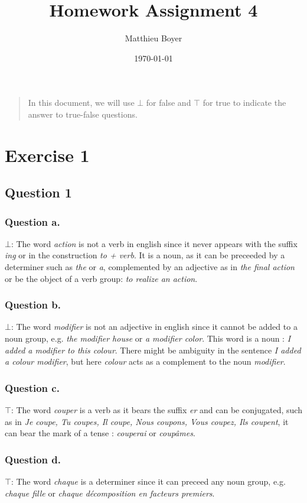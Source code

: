 \documentclass{cours}
\date{\today}
\title{Homework Assignment 4}
\author{Matthieu Boyer}
\begin{document}
\begin{quote}
    In this document, we will use $\bot$ for \textmd{false} and $\top$ for \textmd{true} to indicate the answer to true-false questions.
\end{quote}

\section{Exercise 1}
\subsection{Question 1}
\tocless\subsubsection{Question a.}
$\bot$: The word \textsl{action} is not a verb in english since it never appears with the suffix \textsl{ing} or in the construction \textsl{to + verb}. It is a noun, as it can be preceeded by a determiner such as \textsl{the} or \textsl{a}, complemented by an adjective as in \textsl{the final action} or be the object of a verb group: \textsl{to realize an action}.

\tocless\subsubsection{Question b.}
$\bot$: The word \textsl{modifier} is not an adjective in english since it cannot be added to a noun group, e.g. \textsl{the modifier house} or \textsl{a modifier color}. This word is a noun : \textsl{I added a modifier to this colour}. There might be ambiguity in the sentence \textsl{I added a colour modifier}, but here \textsl{colour} acts as a complement to the noun \textsl{modifier}.

\tocless\subsubsection{Question c.}
$\top$: The word \textsl{couper} is a verb as it bears the suffix \textsl{er} and can be conjugated, such as in \textsl{Je coupe, Tu coupes, Il coupe, Nous coupons, Vous coupez, Ils coupent}, it can bear the mark of a tense : \textsl{couperai} or \textsl{coupâmes}. 

\tocless\subsubsection{Question d.}
$\top$: The word \textsl{chaque} is a determiner since it can preceed any noun group, e.g. \textsl{chaque fille} or \textsl{chaque décomposition en facteurs premiers}. 
\end{document}
